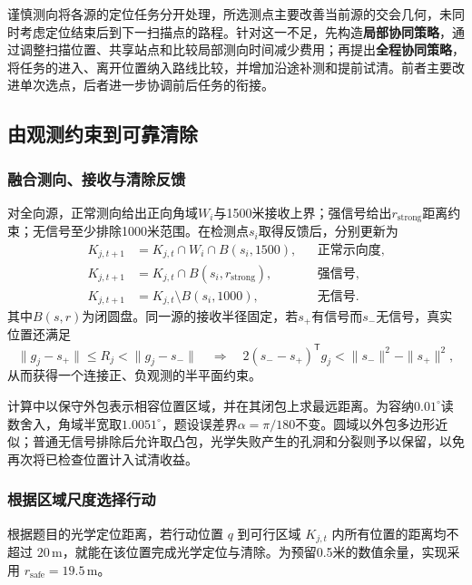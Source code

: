谨慎测向将各源的定位任务分开处理，所选测点主要改善当前源的交会几何，未同时考虑定位结束后到下一扫描点的路程。针对这一不足，先构造\textbf{局部协同策略}，通过调整扫描位置、共享站点和比较局部测向时间减少费用；再提出\textbf{全程协同策略}，将任务的进入、离开位置纳入路线比较，并增加沿途补测和提前试清。前者主要改进单次选点，后者进一步协调前后任务的衔接。

\subsection{由观测约束到可靠清除}

\subsubsection{融合测向、接收与清除反馈}

对全向源，正常测向给出正向角域$W_i$与1500米接收上界；强信号给出$r_{\mathrm{strong}}$距离约束；无信号至少排除1000米范围。在检测点$s_i$取得反馈后，分别更新为
\begin{equation}
\begin{aligned}
 K_{j,t+1}&=K_{j,t}\cap W_i\cap B(s_i,1500), &&\text{正常示向度},\\
 K_{j,t+1}&=K_{j,t}\cap B(s_i,r_{\mathrm{strong}}), &&\text{强信号},\\
 K_{j,t+1}&=K_{j,t}\setminus B(s_i,1000), &&\text{无信号}.
\end{aligned}
\label{eq:q3-update}
\end{equation}
其中$B(s,r)$为闭圆盘。同一源的接收半径固定，若$s_+$有信号而$s_-$无信号，真实位置还满足
\begin{equation}
\|g_j-s_+\|\le R_j<\|g_j-s_-\|
\quad\Longrightarrow\quad
2(s_--s_+)^{\mathsf T}g_j<\|s_-\|^2-\|s_+\|^2,
\label{eq:q3-coupling}
\end{equation}
从而获得一个连接正、负观测的半平面约束。

计算中以保守外包表示相容位置区域，并在其闭包上求最远距离。为容纳$0.01^\circ$读数舍入，角域半宽取$1.0051^\circ$，题设误差界$\alpha=\pi/180$不变。圆域以外包多边形近似；普通无信号排除后允许取凸包，光学失败产生的孔洞和分裂则予以保留，以免再次将已检查位置计入试清收益。

\subsubsection{根据区域尺度选择行动}

根据题目的光学定位距离，若行动位置 \(q\) 到可行区域 \(K_{j,t}\) 内所有位置的距离均不超过 \(20\,\mathrm{m}\)，就能在该位置完成光学定位与清除。为预留0.5米的数值余量，实现采用 \(r_{\mathrm{safe}}=19.5\,\mathrm{m}\)。

